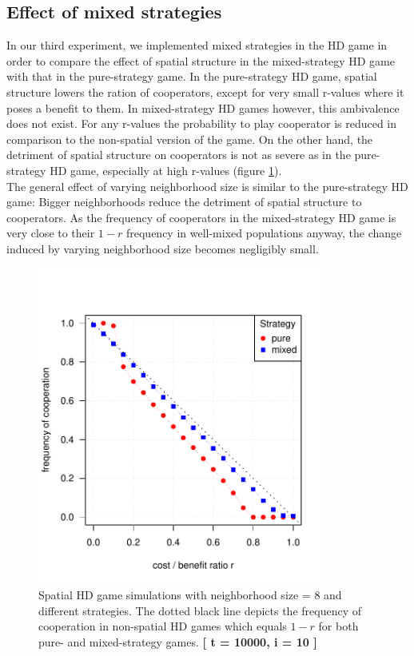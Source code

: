 \subsection{Effect of mixed strategies}
In our third experiment, we implemented mixed strategies in the HD game in order to compare the effect of spatial structure in the mixed-strategy HD game with that in the pure-strategy game. In the pure-strategy HD game, spatial structure lowers the ration of cooperators, except for very small r-values where it poses a benefit to them. In mixed-strategy HD games however, this ambivalence does not exist. For any r-values the probability to play cooperator is reduced in comparison to the non-spatial version of the game. On the other hand, the detriment of spatial structure on cooperators is not as severe as in the pure-strategy HD game, especially at high r-values (figure \ref*{fig: task3_multiplot}).\\ 
The general effect of varying neighborhood size is similar to the pure-strategy HD game: Bigger neighborhoods reduce the detriment of spatial structure to cooperators. As the frequency of cooperators in the mixed-strategy HD game is very close to their $1-r$ frequency in well-mixed populations anyway, the change induced by varying neighborhood size becomes negligibly small.



\begin{figure}[H]
	\centering 
	\includegraphics[width=9.5cm]{task3_multiplot}
	\caption{Spatial HD game simulations with neighborhood size = 8 and different strategies. The dotted black line depicts the frequency of cooperation in non-spatial HD games which equals $1-r$ for both pure- and mixed-strategy games.  \textbf{[ t = 10000, i = 10 ]} }\label{fig: task3_multiplot}
\end{figure}







